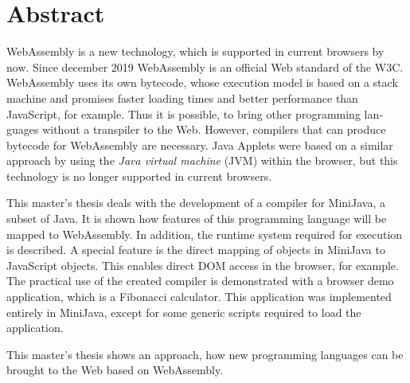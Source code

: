 \chapter{Abstract}


\begin{english}
WebAssembly is a new technology, which is supported in current browsers by now. Since december 2019 WebAssembly is an official Web standard of the W3C. WebAssembly uses its own bytecode, whose execution model is based on a stack machine and promises faster loading times and better performance than JavaScript, for example. Thus it is possible, to bring other programming languages without a transpiler to the Web. However, compilers that can produce bytecode for WebAssembly are necessary. Java Applets were based on a similar approach by using the \emph{Java virtual machine} (JVM) within the browser, but this technology is no longer supported in current browsers.

This master's thesis deals with the development of a compiler for MiniJava, a subset of Java. It is shown how features of this programming language will be mapped to WebAssembly. In addition, the runtime system required for execution is described. A special feature is the direct mapping of objects in MiniJava to JavaScript objects. This enables direct DOM access in the browser, for example. The practical use of the created compiler is demonstrated with a browser demo application, which is a Fibonacci calculator. This application was implemented entirely in MiniJava, except for some generic scripts required to load the application.

This master's thesis shows an approach, how new programming languages can be brought to the Web based on WebAssembly.
\end{english}
